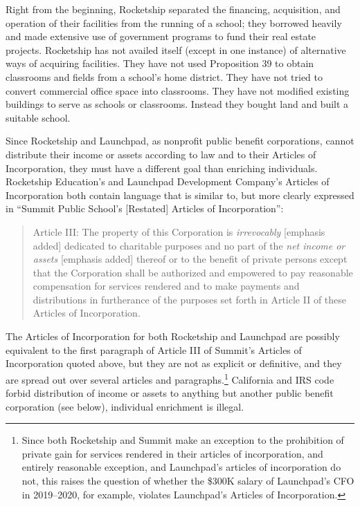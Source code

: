 Right from the beginning, Rocketship separated the financing, acquisition, and operation of their facilities from the running of a school; they borrowed heavily and made extensive use of government programs to fund their real estate projects. Rocketship has not availed itself (except in one instance) of alternative ways of acquiring facilities. They have not used Proposition 39 to obtain classrooms and fields from a school's home district. They have not tried to convert commercial office space into classrooms. They have not modified existing buildings to serve as schools or classrooms. Instead they bought land and built a suitable school.

Since Rocketship and Launchpad, as nonprofit public benefit corporations, cannot distribute their income or assets according to law and to their Articles of Incorporation, they must have a different goal than enriching individuals. Rocketship Education's and Launchpad Development Company's Articles of Incorporation both contain language that is similar to, but more clearly expressed in ``Summit Public School's [Restated] Articles of Incorporation'':
\begin{quotation}
Article III: The property of this Corporation is \textit{irrevocably} [emphasis added] dedicated to charitable purposes and no part of the \textit{net income or assets} [emphasis added] thereof or to the benefit of private persons except that the Corporation shall be authorized and empowered to pay reasonable compensation for services rendered and to make payments and distributions in furtherance of the purposes set forth in Article II of these Articles of Incorporation. \parencite[2]{SummitPublicSchools2017}
\end{quotation}
The Articles of Incorporation for both Rocketship and Launchpad are possibly equivalent to the first paragraph of Article III of Summit's Articles of Incorporation quoted above, but they are not as explicit or definitive, and they are spread out over several articles and paragraphs.\footnote{Since both Rocketship and Summit make an exception to the prohibition of private gain for services rendered in their articles of incorporation, and entirely reasonable exception, and Launchpad's articles of incorporation do not, this raises the question of whether the \$300K salary of Launchpad's CFO \parencite[7]{zotero-16512} in 2019–2020, for example, violates Launchpad's Articles of Incorporation.} California and IRS code forbid distribution of income or assets to anything but another public benefit corporation (see  below), individual enrichment is illegal. 

